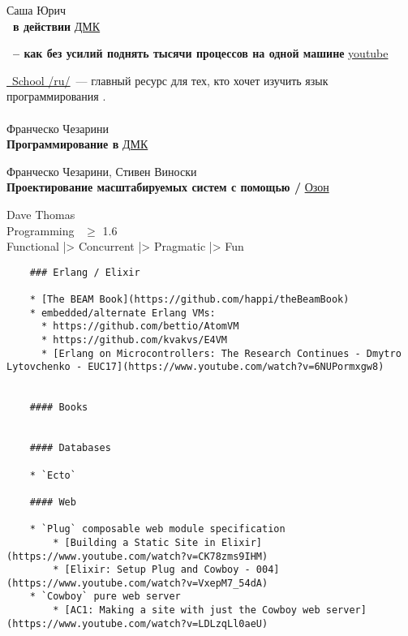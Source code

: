 \begin{thebibliography}{99}

Саша Юрич\\
\textbf{\ex\ в действии}
\href{https://dmkpress.com/catalog/computer/programming/functional/978-5-97060-773-2/}{ДМК}

\textbf{\ex\ -- как без усилий поднять тысячи процессов на одной машине}
\href{https://www.youtube.com/watch?v=jmW5ngfYmdc}{youtube}

\href{https://elixirschool.com/ru/}{\ex\ School /ru/}\ --- главный ресурс для тех, кто хочет изучить язык программирования \ex.

\paragraph{\erl}

Франческо Чезарини\\
\textbf{Программирование в \erl}
\href{https://dmkpress.com/catalog/computer/programming/functional/978-5-94074-617-1/}{ДМК}

Франческо Чезарини, Стивен Виноски\\
\textbf{Проектирование масштабируемых систем с помощью \erl/\otp}
\href{https://www.ozon.ru/context/detail/id/140152220/}{Озон}

\clearpage

Dave Thomas\\
Programming \ex\ $\geq$ 1.6\\
Functional |> Concurrent |> Pragmatic |> Fun

\end{thebibliography}

\clearpage
\begin{verbatim}
    ### Erlang / Elixir
    
    * [The BEAM Book](https://github.com/happi/theBeamBook)
    * embedded/alternate Erlang VMs:
      * https://github.com/bettio/AtomVM
      * https://github.com/kvakvs/E4VM
      * [Erlang on Microcontrollers: The Research Continues - Dmytro Lytovchenko - EUC17](https://www.youtube.com/watch?v=6NUPormxgw8)
    
    
    #### Books
    
    
    #### Databases
    
    * `Ecto`
    
    #### Web
    
    * `Plug` composable web module specification
        * [Building a Static Site in Elixir](https://www.youtube.com/watch?v=CK78zms9IHM)
        * [Elixir: Setup Plug and Cowboy - 004](https://www.youtube.com/watch?v=VxepM7_54dA)
    * `Cowboy` pure web server
        * [AC1: Making a site with just the Cowboy web server](https://www.youtube.com/watch?v=LDLzqLl0aeU)
    
        
\end{verbatim}